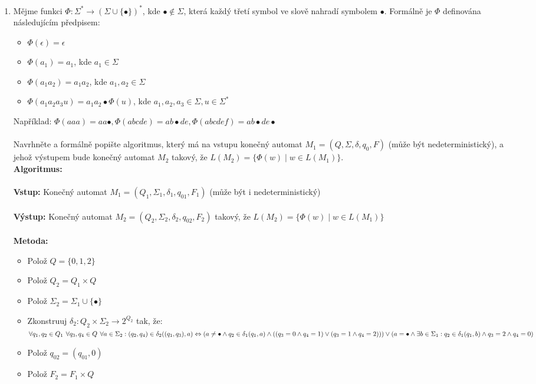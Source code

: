 \documentclass[a4paper,11pt]{article}[24.3.2010]
\begin{document}
\begin{enumerate}
\newpage

  \item Mějme funkci $\Phi : \Sigma^* \rightarrow (\Sigma \cup \{\bullet\})^*$, kde $\bullet \notin \Sigma$, která každý třetí symbol ve slově nahradí symbolem $\bullet$. Formálně je $\Phi$ definována následujícím předpisem:
    \begin{itemize}
      \item $\Phi(\epsilon) = \epsilon$
      \item $\Phi(a_{1}) = a_{1}$, kde $a_{1} \in \Sigma$
      \item $\Phi(a_{1}a_{2}) = a_{1}a_{2}$, kde $a_{1},a_{2} \in \Sigma$
      \item $\Phi(a_{1}a_{2}a_{3}u) = a_{1}a_{2}\bullet\Phi(u)$, kde $a_{1},a_{2},a_{3} \in \Sigma, u \in \Sigma^*$
    \end{itemize}
    Například: $\Phi(aaa) = aa\bullet, \Phi(abcde) = ab\bullet de, \Phi(abcdef) = ab\bullet de\bullet$\\\\
Navrhněte a formálně popište algoritmus, který má na vstupu konečný automat $M_{1}=(Q,\Sigma,\delta,q_{0},F)$ (může být nedeterministický), a jehož výstupem bude konečný automat $M_{2}$ takový, že $L(M_{2})=\{\Phi(w) \mid w \in L(M_{1})\}$.\\

{\bf Algoritmus:}\\\\
{\bf Vstup:} Konečný automat $M_{1}=(Q_{1},\Sigma_{1},\delta_{1},q_{01},F_{1})$ (může být i nedeterministický)\\\\
{\bf Výstup:} Konečný automat $M_{2}=(Q_{2},\Sigma_{2},\delta_{2},q_{02},F_{2})$ takový, že $L(M_{2})=\{\Phi(w) \mid w \in L(M_{1})\}$\\\\
{\bf Metoda:}
\begin{itemize}
\item Polož $Q=\{0, 1, 2\}$
\item Polož $Q_{2}= Q_{1} \times Q$
\item Polož $\Sigma_{2}= \Sigma_{1} \cup \{\bullet\}$
\item Zkonstruuj $\delta_{2} : Q_{2} \times \Sigma_{2} \rightarrow 2^{Q_{2}}$ tak, že:\\
$\forall q_{1}, q_{2} \in Q_{1} \hspace{4pt} \forall q_{3}, q_{4} \in Q \hspace{4pt} \forall a \in \Sigma_{2}:\\ 
(q_{2}, q_{4}) \in \delta_{2}((q_{1}, q_{3}), a) \Leftrightarrow\\ 
(a \neq \bullet \wedge q_{2} \in \delta_{1}(q_{1}, a) \wedge ((q_{3}=0 \wedge q_{4}=1) \vee (q_{3}=1 \wedge q_{4}=2))) \vee\\
(a = \bullet \wedge \exists b \in \Sigma_{1} : q_{2} \in \delta_{1}(q_{1}, b) \wedge q_{3}=2 \wedge q_{4}=0)$
\item Polož $q_{02}= (q_{01}, 0)$
\item Polož $F_{2}= F_{1} \times Q$


\end{itemize}
\end{enumerate}
\end{document}
